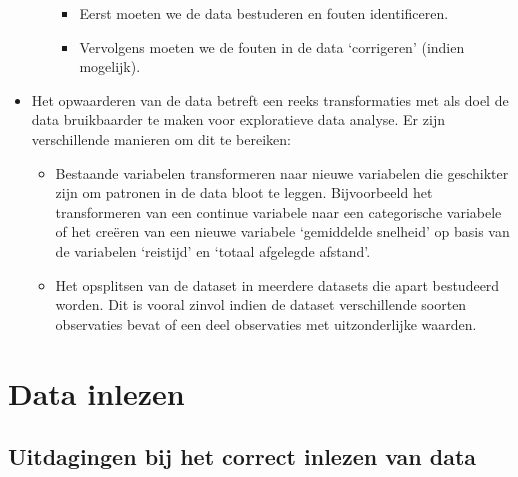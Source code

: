 \documentclass[]{tufte-book}
\providecommand{\tightlist}{%
  \setlength{\itemsep}{0pt}\setlength{\parskip}{0pt}}
\begin{document}
\begin{itemize}
\begin{itemize}
    \begin{itemize}
    \tightlist
    \item
      Eerst moeten we de data bestuderen en fouten identificeren.
    \item
      Vervolgens moeten we de fouten in de data `corrigeren' (indien mogelijk).
    \end{itemize}
  \end{itemize}
\item
  Het opwaarderen van de data betreft een reeks transformaties met als doel de data bruikbaarder te maken voor exploratieve data analyse. Er zijn verschillende manieren om dit te bereiken:

  \begin{itemize}
  \tightlist
  \item
    Bestaande variabelen transformeren naar nieuwe variabelen die geschikter zijn om patronen in de data bloot te leggen. Bijvoorbeeld het transformeren van een continue variabele naar een categorische variabele of het creëren van een nieuwe variabele `gemiddelde snelheid' op basis van de variabelen `reistijd' en `totaal afgelegde afstand'.
  \item
    Het opsplitsen van de dataset in meerdere datasets die apart bestudeerd worden. Dit is vooral zinvol indien de dataset verschillende soorten observaties bevat of een deel observaties met uitzonderlijke waarden.
  \end{itemize}
\end{itemize}

\hypertarget{data-inlezen}{%
\section{Data inlezen}\label{data-inlezen}}

\hypertarget{uitdagingen-bij-het-correct-inlezen-van-data}{%
\subsection{Uitdagingen bij het correct inlezen van data}\label{uitdagingen-bij-het-correct-inlezen-van-data}}
\end{document}
